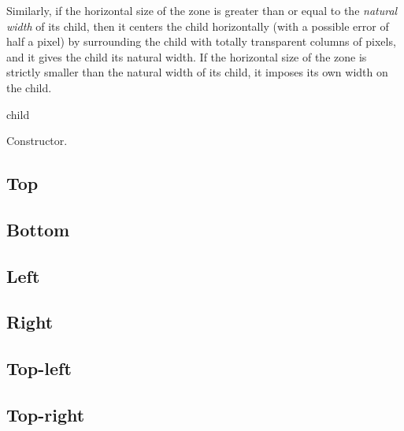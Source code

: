 Similarly, if the horizontal size of the  zone is greater than or
equal to the \emph{natural width} of its child, then it centers the
child horizontally (with a possible error of half a pixel) by
surrounding the child with totally transparent columns of pixels, and it
gives the child its natural width.  If the horizontal size of
the  zone is strictly smaller than the natural width of
its child, it imposes its own width on the child.



 {\optional child}

Constructor. 

\subsection{Top}



\subsection{Bottom}



\subsection{Left}



\subsection{Right}



\subsection{Top-left}



\subsection{Top-right}

